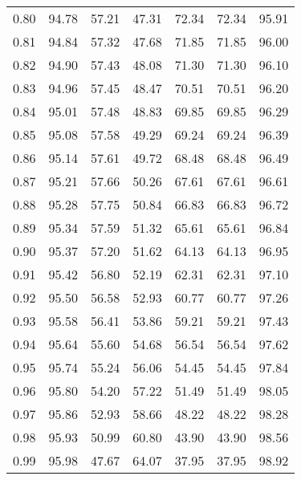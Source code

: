 \begin{tabular}{|c|c|c|c|c|c|c|}
      0.80 &     94.78 &     57.21 &      47.31 &   72.34 &      72.34 &         95.91 \\
      0.81 &     94.84 &     57.32 &      47.68 &   71.85 &      71.85 &         96.00 \\
      0.82 &     94.90 &     57.43 &      48.08 &   71.30 &      71.30 &         96.10 \\
      0.83 &     94.96 &     57.45 &      48.47 &   70.51 &      70.51 &         96.20 \\
      0.84 &     95.01 &     57.48 &      48.83 &   69.85 &      69.85 &         96.29 \\
      0.85 &     95.08 &     57.58 &      49.29 &   69.24 &      69.24 &         96.39 \\
      0.86 &     95.14 &     57.61 &      49.72 &   68.48 &      68.48 &         96.49 \\
      0.87 &     95.21 &     57.66 &      50.26 &   67.61 &      67.61 &         96.61 \\
      0.88 &     95.28 &     57.75 &      50.84 &   66.83 &      66.83 &         96.72 \\
      0.89 &     95.34 &     57.59 &      51.32 &   65.61 &      65.61 &         96.84 \\
      0.90 &     95.37 &     57.20 &      51.62 &   64.13 &      64.13 &         96.95 \\
      0.91 &     95.42 &     56.80 &      52.19 &   62.31 &      62.31 &         97.10 \\
      0.92 &     95.50 &     56.58 &      52.93 &   60.77 &      60.77 &         97.26 \\
      0.93 &     95.58 &     56.41 &      53.86 &   59.21 &      59.21 &         97.43 \\
      0.94 &     95.64 &     55.60 &      54.68 &   56.54 &      56.54 &         97.62 \\
      0.95 &     95.74 &     55.24 &      56.06 &   54.45 &      54.45 &         97.84 \\
      0.96 &     95.80 &     54.20 &      57.22 &   51.49 &      51.49 &         98.05 \\
      0.97 &     95.86 &     52.93 &      58.66 &   48.22 &      48.22 &         98.28 \\
      0.98 &     95.93 &     50.99 &      60.80 &   43.90 &      43.90 &         98.56 \\
      0.99 &     95.98 &     47.67 &      64.07 &   37.95 &      37.95 &         98.92 \\
\bottomrule
\end{tabular}
